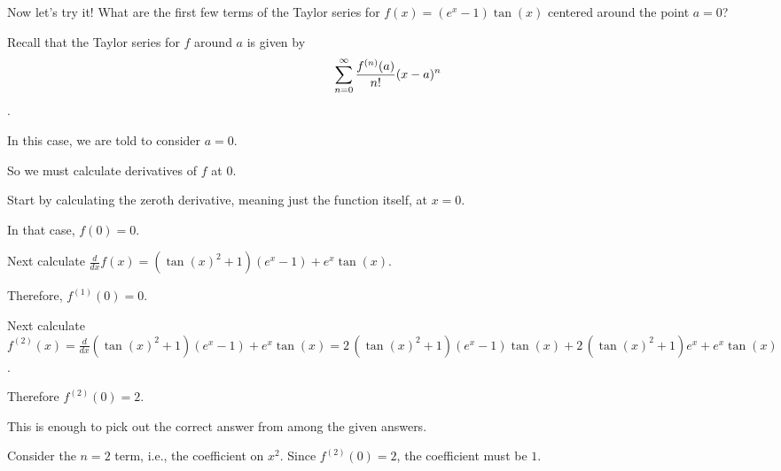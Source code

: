 \documentclass{ximera}
\begin{document}
            \begin{question}
              Now let's try it!  What are the first few terms of the Taylor series for \(f(x) = {\left(e^{x} - 1\right)} \tan\left(x\right)\) centered around the point \(a = 0\)?

              \begin{solution}
                \begin{hint}
                  
Recall that the Taylor series for \(f\) around \(a\) is given by \[\displaystyle\sum_{n=0}^\infty {f^{(n)}(a)\over n!}(x-a)^n\].
                \end{hint}
                \begin{hint}
                  In this case, we are told to consider \(a = 0\).
                \end{hint}
                \begin{hint}
                  So we must calculate derivatives of \(f\) at \(0\).
                \end{hint}
                \begin{hint}
                  Start by calculating the zeroth derivative, meaning just the function itself, at \(x = 0\).
                \end{hint}
                \begin{hint}
                  In that case, \(f(0) = 0\).
                \end{hint}
                \begin{hint}
                  Next calculate \(\displaystyle\frac{d}{dx} f(x) = {\left(\tan\left(x\right)^{2} + 1\right)} {\left(e^{x} - 1\right)} + e^{x} \tan\left(x\right)\).
                \end{hint}
                \begin{hint}
                  Therefore, \(f^{(1)}(0) = 0\).
                \end{hint}
                \begin{hint}
                  Next calculate \(f^{(2)}(x) = \displaystyle\frac{d}{dx} {\left(\tan\left(x\right)^{2} + 1\right)} {\left(e^{x} - 1\right)} + e^{x} \tan\left(x\right) = 2 \, {\left(\tan\left(x\right)^{2} + 1\right)} {\left(e^{x} - 1\right)} \tan\left(x\right) + 2 \, {\left(\tan\left(x\right)^{2} + 1\right)} e^{x} + e^{x} \tan\left(x\right)\).
                \end{hint}
                \begin{hint}
                  Therefore \(f^{(2)}(0) = 2\).
                \end{hint}
                \begin{hint}
                  This is enough to pick out the correct answer from among the given answers.
                \end{hint}
                \begin{hint}
                  Consider the \(n = 2\) term, i.e., the coefficient on \(x^2\).  Since \(f^{(2)}(0) = 2\), the coefficient must be \(1\).


\end{hint}
\end{solution}
\end{question}
\end{document}
